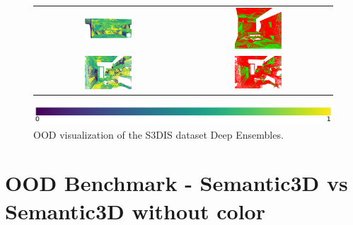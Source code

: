 \begin{figure}[h!]
\begin{tabular}{cc}
                \includegraphics[width=0.33\textwidth, height=0.18\textheight]{images/ood_imgs/fout_s3dis/pnt_1_fout_ent.png}& 
                \includegraphics[width=0.33\textwidth, height=0.18\textheight]{images/ood_imgs/fout_s3dis/fout_ent_3.png}\\
    
                \includegraphics[width=0.33\textwidth, height=0.18\textheight]{images/ood_imgs/fout_s3dis/ofc_42_fout_ent.png}& 
                \includegraphics[width=0.33\textwidth, height=0.18\textheight]{images/ood_imgs/fout_s3dis/fout_ent_1.png}\\
            \end{tabular}
            \includegraphics[scale=0.45]{images/prob_legend.pdf}
            \caption{OOD visualization of the S3DIS dataset Deep Ensembles.}
            \label{fig:fout_s3dis_oodmap_ent}
        \end{figure}
        \FloatBarrier
    \section{OOD Benchmark - Semantic3D vs Semantic3D without color}
